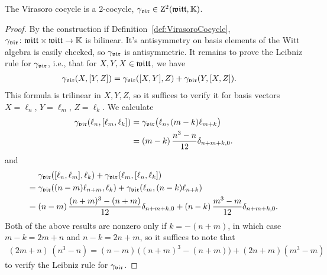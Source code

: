 \begin{lemma}
  \label{lem:VirasoroCocycle_is_TwoCocycle}
  \leanok
  The Virasoro cocycle is a 2-cocycle, ${\gamma}_{\mathfrak{vir}} \in \mathrm{Z}^2(\mathfrak{witt},\mathbb{K})$.
\end{lemma}
\begin{proof}
  \leanok
  By the construction if Definition~\ref{def:VirasoroCocycle},
  ${\gamma}_{\mathfrak{vir}} \colon \mathfrak{witt} \times \mathfrak{witt} \to \mathbb{K}$ is bilinear.
  It's antisymmetry on basis elements of the Witt algebra is easily checked,
  so ${\gamma}_{\mathfrak{vir}}$ is antisymmetric. It remains to prove the Leibniz
  rule for ${\gamma}_{\mathfrak{vir}}$, i.e., that for $X,Y,X \in \mathfrak{witt}$, we have
  \begin{align}\label{eq:LieTwoCocycle.leibniz}
    {\gamma}_{\mathfrak{vir}}(X,[Y,Z]) = \; & {\gamma}_{\mathfrak{vir}}([X,Y],Z) + {\gamma}_{\mathfrak{vir}}(Y,[X,Z]) .
  \end{align}
  This formula is trilinear in $X,Y,Z$, so it suffices to verify it for basis
  vectors $X=\ell_n$, $Y=\ell_m$, $Z=\ell_k$. We calculate
  \begin{align}
    {\gamma}_{\mathfrak{vir}}(\ell_n , [\ell_m , \ell_k])
    = \; & {\gamma}_{\mathfrak{vir}}\big( \ell_n , (m-k) \ell_{m+k} \big) \\
    = \; & (m-k) \, \frac{n^3 - n}{12} \delta_{n+m+k,0} .
  \end{align}
  and
  \begin{align}
         & {\gamma}_{\mathfrak{vir}}([\ell_n , \ell_m] , \ell_k)
          + {\gamma}_{\mathfrak{vir}}(\ell_m , [\ell_n , \ell_k]) \\
    = \; & {\gamma}_{\mathfrak{vir}}((n-m) \ell_{n+m} , \ell_k)
          + {\gamma}_{\mathfrak{vir}}(\ell_m , (n-k) \ell_{n+k}) \\
    = \; & (n-m) \, \frac{(n+m)^3 - (n+m)}{12} \delta_{n+m+k,0}
          + (n-k) \, \frac{m^3-m}{12} \delta_{n+m+k,0} .
  \end{align}
  Both of the above results are nonzero only if $k=-(n+m)$,
  in which case $m-k = 2m+n$ and $n-k = 2n+m$,
  so it suffices to note that
  \begin{align*}
    (2m+n) \, (n^3 - n)
      = (n-m) \, \big( (n+m)^3 - (n+m) \big)
        + (2 n + m) (m^3 - m)
  \end{align*}
  to verify the Leibniz rule for ${\gamma}_{\mathfrak{vir}}$.
\end{proof}


